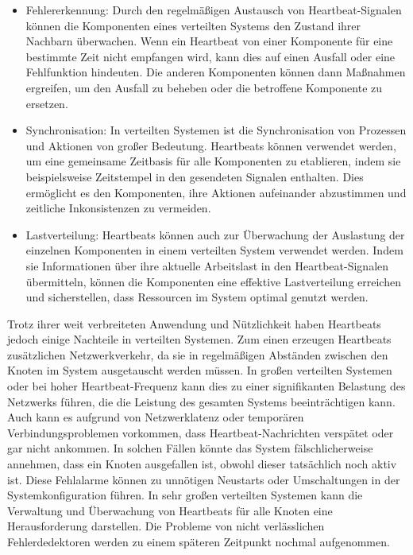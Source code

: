 \begin{itemize}
\item Fehlererkennung: Durch den regelmäßigen Austausch von Heartbeat-Signalen können die Komponenten eines verteilten Systems den Zustand ihrer Nachbarn überwachen. Wenn ein Heartbeat von einer Komponente für eine bestimmte Zeit nicht empfangen wird, kann dies auf einen Ausfall oder eine Fehlfunktion hindeuten. Die anderen Komponenten können dann Maßnahmen ergreifen, um den Ausfall zu beheben oder die betroffene Komponente zu ersetzen.
\item Synchronisation: In verteilten Systemen ist die Synchronisation von Prozessen und Aktionen von großer Bedeutung. Heartbeats können verwendet werden, um eine gemeinsame Zeitbasis für alle Komponenten zu etablieren, indem sie beispielsweise Zeitstempel in den gesendeten Signalen enthalten. Dies ermöglicht es den Komponenten, ihre Aktionen aufeinander abzustimmen und zeitliche Inkonsistenzen zu vermeiden.
\item Lastverteilung: Heartbeats können auch zur Überwachung der Auslastung der einzelnen Komponenten in einem verteilten System verwendet werden. Indem sie Informationen über ihre aktuelle Arbeitslast in den Heartbeat-Signalen übermitteln, können die Komponenten eine effektive Lastverteilung erreichen und sicherstellen, dass Ressourcen im System optimal genutzt werden.
\end{itemize}
Trotz ihrer weit verbreiteten Anwendung und Nützlichkeit haben Heartbeats jedoch einige Nachteile in verteilten Systemen. Zum einen erzeugen Heartbeats zusätzlichen Netzwerkverkehr, da sie in regelmäßigen Abständen zwischen den Knoten im System ausgetauscht werden müssen. In großen verteilten Systemen oder bei hoher Heartbeat-Frequenz kann dies zu einer signifikanten Belastung des Netzwerks führen, die die Leistung des gesamten Systems beeinträchtigen kann. Auch kann es aufgrund von Netzwerklatenz oder temporären Verbindungsproblemen vorkommen, dass Heartbeat-Nachrichten verspätet oder gar nicht ankommen. In solchen Fällen könnte das System fälschlicherweise annehmen, dass ein Knoten ausgefallen ist, obwohl dieser tatsächlich noch aktiv ist. Diese Fehlalarme können zu unnötigen Neustarts oder Umschaltungen in der Systemkonfiguration führen.
In sehr großen verteilten Systemen kann die Verwaltung und Überwachung von Heartbeats für alle Knoten eine Herausforderung darstellen.
Die Probleme von nicht verlässlichen Fehlerdedektoren werden zu einem späteren Zeitpunkt nochmal aufgenommen. 
\\\\
